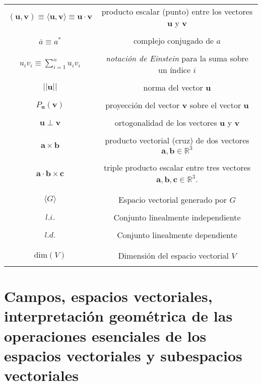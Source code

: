 \documentclass[12pt]{article}
\begin{document}
\begin{tcolorbox}
\begin{tabular}{cc}
    $(\mathbf{u},\mathbf{v}) \equiv \langle\mathbf{u},\mathbf{v}\rangle \equiv \mathbf{u}\cdot\mathbf{v}$ & producto escalar (punto) entre los vectores $\mathbf{u}$ y $\mathbf{v}$ \\ \\
    $\overline{a} \equiv a^*$ & complejo conjugado de $a$ \\ \\
    $u_i v_i \equiv \sum_{i=1}^n u_i v_i$ & \textit{notación de Einstein} para la suma sobre un índice $i$ \\ \\
    $||\mathbf{u}||$ & norma del vector $\mathbf{u}$ \\ \\
    $P_{\mathbf{u}}(\mathbf{v})$ & proyección del vector $\mathbf{v}$ sobre el vector $\mathbf{u}$ \\ \\
    $\mathbf{u}\perp\mathbf{v}$ & ortogonalidad de los vectores $\mathbf{u}$ y $\mathbf{v}$ \\ \\
    $\mathbf{a}\times\mathbf{b}$ & producto vectorial (cruz) de dos vectores $\mathbf{a},\mathbf{b}\in\mathbb{R}^3$ \\ \\
    $\mathbf{a}\cdot\mathbf{b}\times\mathbf{c}$ & triple producto escalar entre tres vectores $\mathbf{a},\mathbf{b},\mathbf{c}\in\mathbb{R}^3$. \\ \\ \\


    $\langle G \rangle $ & Espacio vectorial generado por $G$ \\ \\
    $l.i.$ & Conjunto linealmente independiente \\ \\
    $l.d.$ & Conjunto linealmente dependiente \\ \\ \\

    $\text{dim}(V)$ & Dimensión del espacio vectorial $V$ \\ \\

\end{tabular}
\end{tcolorbox}

\newpage
\section{Campos, espacios vectoriales, interpretación geométrica de las operaciones esenciales de los espacios vectoriales y subespacios vectoriales}
\end{document}
